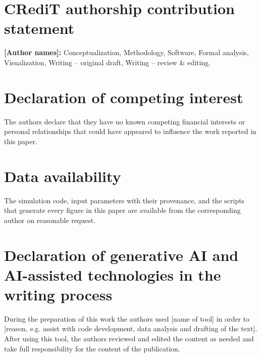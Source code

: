 \section*{CRediT authorship contribution statement}
\textbf{[Author names]:} Conceptualization, Methodology, Software, Formal analysis, Visualization, Writing -- original draft, Writing -- review \& editing.

\section*{Declaration of competing interest}
The authors declare that they have no known competing financial interests or personal relationships that could have appeared to influence the work reported in this paper.

\section*{Data availability}
The simulation code, input parameters with their provenance, and the scripts that generate every figure in this paper are available from the corresponding author on reasonable request.

\section*{Declaration of generative AI and AI-assisted technologies in the writing process}
During the preparation of this work the authors used [name of tool] in order to [reason, e.g. assist with code development, data analysis and drafting of the text]. After using this tool, the authors reviewed and edited the content as needed and take full responsibility for the content of the publication.
